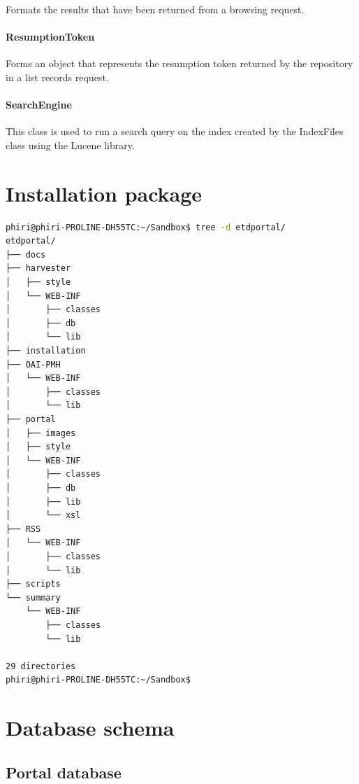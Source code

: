 \documentclass[a4paper,11pt]{article}
\begin{document}
Formats the results that have been returned from a browsing request.

\paragraph{ResumptionToken}

Forms an object that represents the resumption token returned by the repository in a list records request.

\paragraph{SearchEngine}

This class is used to run a search query on the index created by the IndexFiles class using the Lucene library.

\ifdefined{}
\else
\fi
{}

\begingroup
\setlength\bibitemsep{10pt} %
\sloppy
\printbibliography
\endgroup

\appendix

\section{Installation package}
\label{sec:installation_package}

\begin{lstlisting}[language=bash]
phiri@phiri-PROLINE-DH55TC:~/Sandbox$ tree -d etdportal/
etdportal/
├── docs
├── harvester
│   ├── style
│   └── WEB-INF
│       ├── classes
│       ├── db
│       └── lib
├── installation
├── OAI-PMH
│   └── WEB-INF
│       ├── classes
│       └── lib
├── portal
│   ├── images
│   ├── style
│   └── WEB-INF
│       ├── classes
│       ├── db
│       ├── lib
│       └── xsl
├── RSS
│   └── WEB-INF
│       ├── classes
│       └── lib
├── scripts
└── summary
    └── WEB-INF
        ├── classes
        └── lib

29 directories
phiri@phiri-PROLINE-DH55TC:~/Sandbox$  
\end{lstlisting}


\section{Database schema}
\label{sec:database_schema}

\subsection{Portal database}
\label{sec:database_schema:portal_database}
\end{document}
